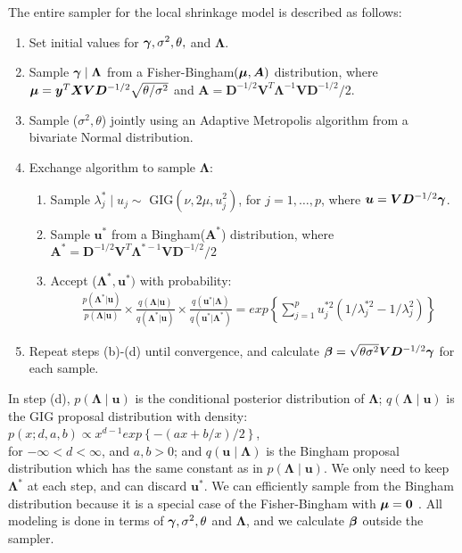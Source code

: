 \documentclass[12pt]{article}
\newcommand{\A}{{\bm  A}}
\newcommand{\D}{{\bm  D}}
\newcommand{\V}{{\bm V}}
\newcommand{\X}{{\bm  X}}
\newcommand{\Lambdabf}{{\mathbf \Lambda}}
\newcommand{\ubf}{{\bm u}}
\newcommand{\ybf}{{\bm y}}
\newcommand{\zerobf}{{\mathbf 0}}
\newcommand{\greekbold}[1]{\mbox{\boldmath $#1$}}
\newcommand{\betabf}{\greekbold{\beta}}
\newcommand{\gammabf}{\greekbold{\gamma}}
\newcommand{\mubf}{\greekbold{\mu}}
\newcommand{\s}{{\sigma^2}}
\begin{document}
The entire sampler for the local shrinkage model is described as follows:
\begin{enumerate}[label=(\alph*)]
    \item Set initial values for  $\gammabf, \sigma^2, \theta, $ and $\Lambdabf$.
    \item Sample $\gammabf\mid\Lambdabf$ from a Fisher-Bingham$\left( \mubf, \A \right)$ distribution,
        where $\mubf = \ybf^T\X \V\D^{-1/2} \sqrt{\theta/\s}$ and $\A=\D^{-1/2}\V^T \Lambdabf^{-1} \V \D^{-1/2}/2$.
    \item Sample ($\sigma^2, \theta $) jointly using an Adaptive Metropolis algorithm from a bivariate Normal distribution.
    \item Exchange algorithm to sample $\Lambdabf$:
        \begin{enumerate}[label=(\roman*)]
            \item Sample $\lambda^*_j \mid u_j \sim \text{ GIG}(\nu, 2\mu , u_j^2)$, for $j = 1, \dots, p$, where $\ubf = \V\D^{-1/2}\gammabf$.
            \item Sample $\ubf^*$ from a Bingham($\A^*$) distribution, where $\A^*=\D^{-1/2}\V^T\Lambdabf^{*-1}\V\D^{-1/2}/2$
            \item Accept ($\Lambdabf^*, \ubf^*)$ with probability:
            \begin{align*}
               & \frac{p(\Lambdabf^*|\ubf)}{p(\Lambdabf|\ubf)}\times \frac{q(\Lambdabf|\ubf)}{q(\Lambdabf^*|\ubf)}\times
               \frac{q(\ubf^*|\Lambdabf)}{q(\ubf^*|\Lambdabf^*)}
                = exp\left\{ \sum_{j=1}^p u_j^{*2} \left( 1/\lambda_j^{*2} -  1/\lambda_j^{2}\right)\right\}
            \end{align*}
        \end{enumerate}
    \item Repeat steps (b)-(d) until convergence, and calculate $\betabf = \sqrt{\theta \s} \V \D^{-1/2} \gammabf$ for each sample.
\end{enumerate}

In step (d), $p(\Lambdabf\mid\ubf)$ is the conditional posterior distribution of $\Lambdabf$;
$q(\Lambdabf\mid\ubf)$ is the GIG proposal distribution with density:  $p(x; d, a, b) \propto x^{d-1} exp\left\{ -(ax + b/x)/2\right\}$, \\for $-\infty<d<\infty$, and $ a,b>0$;
and $q(\ubf\mid\Lambdabf)$ is the Bingham proposal distribution which has the same constant as in $p(\Lambdabf\mid\ubf)$.
We only need to keep $\Lambdabf^*$ at each step, and can discard $\ubf^*$.
We can efficiently sample from the Bingham distribution because it is a special case of the Fisher-Bingham with $\mubf = \zerobf$ \citep{kent2013new}.
All modeling is done in terms of $\gammabf, \s, \theta$ and $\Lambdabf$, and we calculate $\betabf$ outside the sampler.
\end{document}
